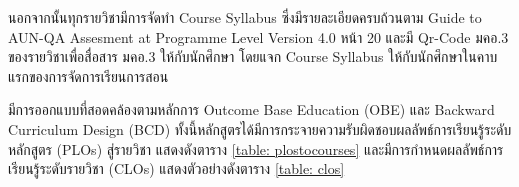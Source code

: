 นอกจากนั้นทุกรายวิชามีการจัดทำ Course Syllabus ซึ่งมีรายละเอียดครบถ้วนตาม Guide to AUN-QA Assesment at Programme Level Version 4.0 หน้า 20 และมี Qr-Code มคอ.3 ของรายวิชาเพื่อสื่อสาร มคอ.3 ให้กับนักศึกษา โดยแจก Course Syllabus ให้กับนักศึกษาในคาบแรกของการจัดการเรียนการสอน

\begin{doclist}
\docitem{\printprogram{} }

\end{doclist}



\printprogram{} มีการออกแบบที่สอดคล้องตามหลักการ Outcome Base Education (OBE) และ Backward Curriculum Design (BCD) 
ทั้งนี้หลักสูตรได้มีการกระจายความรับผิดชอบผลลัพธ์การเรียนรู้ระดับหลักสูตร (PLOs) สู่รายวิชา แสดงดังตาราง \ref{table: plostocourses}  และมีการกำหนดผลลัพธ์การเรียนรู้ระดับรายวิชา (CLOs)  แสดงตัวอย่างดังตาราง \ref{table: clos}


